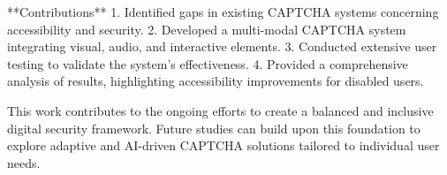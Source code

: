 **Contributions**  
1. Identified gaps in existing CAPTCHA systems concerning accessibility and security.  
2. Developed a multi-modal CAPTCHA system integrating visual, audio, and interactive elements.  
3. Conducted extensive user testing to validate the system's effectiveness.  
4. Provided a comprehensive analysis of results, highlighting accessibility improvements for disabled users.  

This work contributes to the ongoing efforts to create a balanced and inclusive digital security framework. Future studies can build upon this foundation to explore adaptive and AI-driven CAPTCHA solutions tailored to individual user needs.  